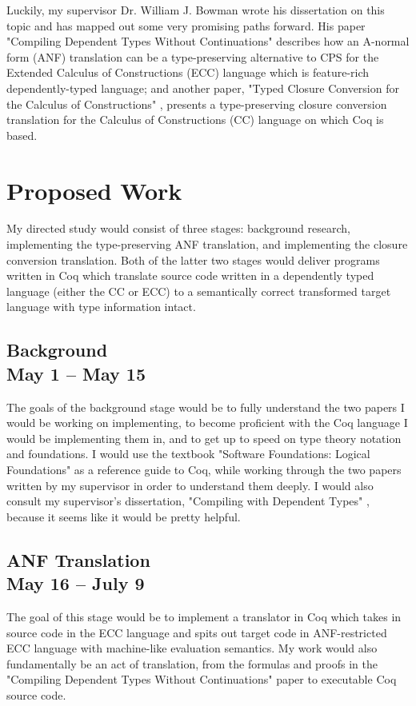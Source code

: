 \documentclass[manuscript]{acmart}
\begin{document}
Luckily, my supervisor Dr. William J. Bowman wrote his dissertation on this topic and has mapped out some very promising paths forward. His paper "Compiling Dependent Types Without Continuations" \cite{bowman_ahmed_2019} describes how an A-normal form (ANF) translation can be a type-preserving alternative to CPS for the Extended Calculus of Constructions (ECC) language which is feature-rich dependently-typed language; and another paper, "Typed Closure Conversion for the Calculus of Constructions" \cite{bowman_ahmed_2018}, presents a type-preserving closure conversion translation for the Calculus of Constructions (CC) language on which Coq is based.

\section{Proposed Work}

My directed study would consist of three stages: background research, implementing the type-preserving ANF translation, and implementing the closure conversion translation. Both of the latter two stages would deliver programs written in Coq which translate source code written in a dependently typed language (either the CC or ECC) to a semantically correct transformed target language with type information intact.
\subsection[Background\\  May 1 -- May 15]{Background\\ \large{May 1 -- May 15}}
The goals of the background stage would be to fully understand the two papers I would be working on implementing, to become proficient with the Coq language I would be implementing them in, and to get up to speed on type theory notation and foundations. I would use the textbook "Software Foundations: Logical Foundations" as a reference guide to Coq, while working through the two papers written by my supervisor in order to understand them deeply. I would also consult my supervisor's dissertation, "Compiling with Dependent Types" \cite{bowman_2019}, because it seems like it would be pretty helpful.
\subsection[ANF Translation\\  May 16 -- July 9]{ANF Translation\\ \large{ May 16 -- July 9}}
The goal of this stage would be to implement a translator in Coq which takes in source code in the ECC language and spits out target code in ANF-restricted ECC language with machine-like evaluation semantics. My work would also fundamentally be an act of translation, from the formulas and proofs in the "Compiling Dependent Types Without Continuations" paper to executable Coq source code.
\end{document}
